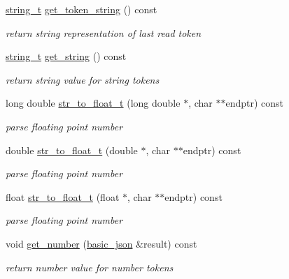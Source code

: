 \begin{DoxyCompactItemize}
\hypertarget{classnlohmann_1_1basic__json_1_1lexer_a5553f152b21bc1024f5ac060ecea0f54}{}\label{classnlohmann_1_1basic__json_1_1lexer_a5553f152b21bc1024f5ac060ecea0f54} 
\hyperlink{classnlohmann_1_1basic__json_ab63e618bbb0371042b1bec17f5891f42}{string\+\_\+t} \hyperlink{classnlohmann_1_1basic__json_1_1lexer_a5553f152b21bc1024f5ac060ecea0f54}{get\+\_\+token\+\_\+string} () const
\begin{DoxyCompactList}\small\item\em return string representation of last read token \end{DoxyCompactList}\item 
\hyperlink{classnlohmann_1_1basic__json_ab63e618bbb0371042b1bec17f5891f42}{string\+\_\+t} \hyperlink{classnlohmann_1_1basic__json_1_1lexer_a51f08b90ba057e1d29fced3b93cb60b3}{get\+\_\+string} () const
\begin{DoxyCompactList}\small\item\em return string value for string tokens \end{DoxyCompactList}\item 
long double \hyperlink{classnlohmann_1_1basic__json_1_1lexer_a94c388ac544f25ed68cdb9426bd22977}{str\+\_\+to\+\_\+float\+\_\+t} (long double $\ast$, char $\ast$$\ast$endptr) const
\begin{DoxyCompactList}\small\item\em parse floating point number \end{DoxyCompactList}\item 
double \hyperlink{classnlohmann_1_1basic__json_1_1lexer_a2109ec1f928689c7f921f4b6b91a9bf9}{str\+\_\+to\+\_\+float\+\_\+t} (double $\ast$, char $\ast$$\ast$endptr) const
\begin{DoxyCompactList}\small\item\em parse floating point number \end{DoxyCompactList}\item 
float \hyperlink{classnlohmann_1_1basic__json_1_1lexer_aa47f8179369be709e5400325772c69ed}{str\+\_\+to\+\_\+float\+\_\+t} (float $\ast$, char $\ast$$\ast$endptr) const
\begin{DoxyCompactList}\small\item\em parse floating point number \end{DoxyCompactList}\item 
void \hyperlink{classnlohmann_1_1basic__json_1_1lexer_a5b8c24b51fefde08b8244113e3bfa070}{get\+\_\+number} (\hyperlink{classnlohmann_1_1basic__json}{basic\+\_\+json} \&result) const
\begin{DoxyCompactList}\small\item\em return number value for number tokens \end{DoxyCompactList}\end{DoxyCompactItemize}
